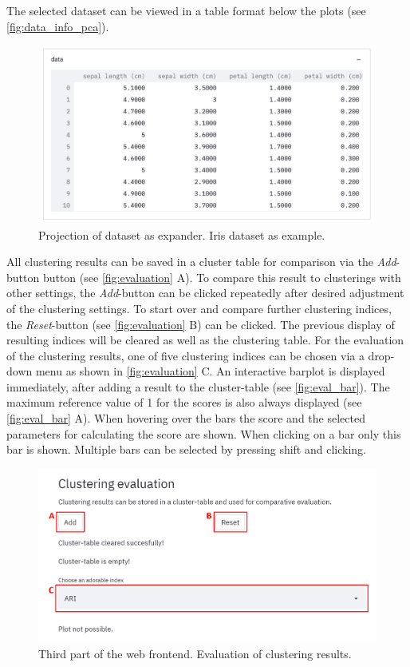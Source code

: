 The selected dataset can be viewed in a table format below the plots (see \autoref{fig:data_info_pca}).

\begin{figure}[H]
	\centering
	\includegraphics[width=\linewidth]{modules/web_frontend/data_info_pca.png}
	\caption{Projection of dataset as expander. Iris dataset as example.}\label{fig:data_info_pca}
\end{figure}

All clustering results can be saved in a cluster table for comparison via the \textit{Add}-button button (see \autoref{fig:evaluation} A). To compare this result to clusterings with other settings, the \textit{Add}-button can be clicked repeatedly after desired adjustment of the clustering settings. To start over and compare further clustering indices, the \textit{Reset}-button (see \autoref{fig:evaluation} B) can be clicked. The previous display of resulting indices will be cleared as well as the clustering table.
For the evaluation of the clustering results, one of five clustering indices can be chosen via a drop-down menu as shown in \autoref{fig:evaluation} C. An interactive barplot is displayed immediately, after adding a result to the cluster-table (see \autoref{fig:eval_bar}). The maximum reference value of 1 for the scores is also always displayed (see \autoref{fig:eval_bar} A). When hovering over the bars the score and the selected parameters for calculating the score are shown. When clicking on a bar only this bar is shown. Multiple bars can be selected by pressing shift and clicking.
\begin{figure}[H]
	\centering
	\includegraphics[width=\linewidth]{modules/web_frontend/evaluation_letters}
	\caption{Third part of the web frontend. Evaluation of clustering results.}\label{fig:evaluation}
\end{figure}

